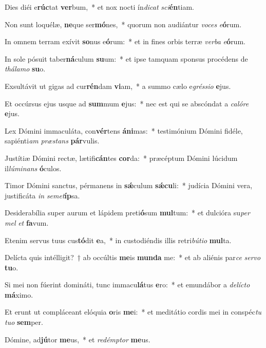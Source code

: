 \item Dies diéi e\textbf{rúc}tat \textbf{ver}bum,~* et nox nocti ín\textit{di}\textit{cat} \textit{sci}\textbf{én}tiam.
\item Non sunt loquélæ, \textbf{ne}que ser\textbf{mó}nes,~* quorum non audiántur \textit{vo}\textit{ces} \textit{e}\textbf{ó}rum.
\item In omnem terram exívit \textbf{so}nus e\textbf{ó}rum:~* et in fines orbis terræ \textit{ver}\textit{ba} \textit{e}\textbf{ó}rum.
\item In sole pósuit taber\textbf{ná}culum \textbf{su}um:~* et ipse tamquam sponsus procédens de \textit{thá}\textit{la}\textit{mo} \textbf{su}o.
\item Exsultávit ut gigas ad cur\textbf{rén}dam \textbf{vi}am,~* a summo cælo e\textit{grés}\textit{si}\textit{o} \textbf{e}jus.
\item Et occúrsus ejus usque ad \textbf{sum}mum \textbf{e}jus:~* nec est qui se abscóndat a \textit{ca}\textit{ló}\textit{re} \textbf{e}jus.
\item Lex Dómini immaculáta, con\textbf{vér}tens \textbf{á}\textbf{ni}mas:~* testimónium Dómini fidéle, sapiénti\textit{am} \textit{præ}\textit{stans} \textbf{pár}vulis.
\item Justítiæ Dómini rectæ, lætifi\textbf{cán}tes \textbf{cor}da:~* præcéptum Dómini lúcidum il\textit{lú}\textit{mi}\textit{nans} \textbf{ó}culos.
\item Timor Dómini sanctus, pérmanens in \textbf{sǽ}culum \textbf{sǽ}\textbf{cu}li:~* judícia Dómini vera, justificáta \textit{in} \textit{se}\textit{met}\textbf{íp}sa.
\item Desiderabília super aurum et lápidem preti\textbf{ó}sum \textbf{mul}tum:~* et dulcióra su\textit{per} \textit{mel} \textit{et} \textbf{fa}vum.
\item Etenim servus tuus cus\textbf{tó}dit \textbf{e}a,~* in custodiéndis illis retri\textit{bú}\textit{ti}\textit{o} \textbf{mul}ta.
\item Delícta quis intélligit?~† ab occúltis \textbf{me}is \textbf{mun}\textbf{da} me:~* et ab aliénis par\textit{ce} \textit{ser}\textit{vo} \textbf{tu}o.
\item Si mei non fúerint domináti, tunc immacu\textbf{lá}tus \textbf{e}ro:~* et emundábor a \textit{de}\textit{líc}\textit{to} \textbf{má}ximo.
\item Et erunt ut compláceant elóquia \textbf{o}ris \textbf{me}i:~* et meditátio cordis mei in conspéc\textit{tu} \textit{tu}\textit{o} \textbf{sem}per.
\item Dómine, ad\textbf{jú}tor \textbf{me}us,~* et \textit{red}\textit{émp}\textit{tor} \textbf{me}us.
